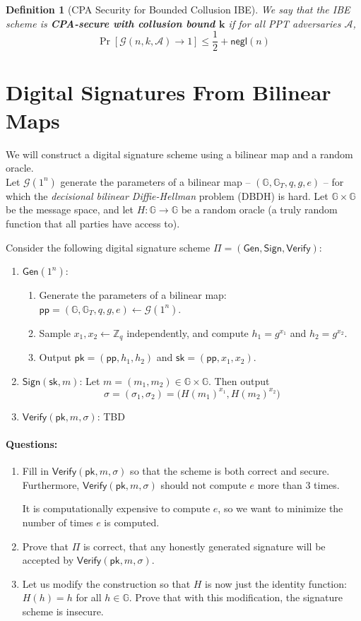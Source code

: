 \documentclass[11pt]{article}
\newtheorem{definition}[theorem]{Definition}
\numberwithin{equation}{section}
\newcommand{\gen}{\mathsf{Gen}}
\newcommand{\sign}{\mathsf{Sign}}
\newcommand{\verify}{\mathsf{Verify}}
\newcommand{\pk}{\mathsf{pk}}
\newcommand{\sk}{\mathsf{sk}}
\newcommand{\params}{\mathsf{pp}}
\newcommand{\A}{\mathcal{A}}
\newcommand{\G}{\mathcal{G}}
\newcommand{\negl}{\mathsf{negl}}
\newcommand{\GG}{\mathbb{G}}
\newcommand{\ZZ}{\mathbb{Z}}
\begin{document}
\begin{definition}[CPA Security for Bounded Collusion IBE]
    We say that the IBE scheme is \textbf{CPA-secure with collusion bound $\mathbf{k}$} if for all PPT adversaries $\A$, 
    \[\Pr[\G(n, k, \A) \to 1] \leq \frac{1}{2} + \negl(n)\]
\end{definition}
\pagebreak


\section{Digital Signatures From Bilinear Maps}
We will construct a digital signature scheme using a bilinear map and a random oracle.\\

Let $\G(1^n)$ generate the parameters of a bilinear map -- $(\GG, \GG_T, q, g, e)$ -- for which the \textit{decisional bilinear Diffie-Hellman} problem (DBDH) is hard.
Let $\GG \times \GG$ be the message space, and let $H: \GG \to \GG$ be a random oracle (a truly random function that all parties have access to).

Consider the following digital signature scheme $\Pi = (\gen, \sign, \verify)$:
\begin{enumerate}
\item $\gen(1^n)$: 
\begin{enumerate}
    \item Generate the parameters of a bilinear map: $\params = (\GG, \GG_T, q, g, e) \leftarrow \G(1^n)$.
    \item Sample $x_1, x_2 \leftarrow \ZZ_q$ independently, and compute $h_1 = g^{x_1}$ and $h_2 = g^{x_2}$.
    \item Output $\pk=(\params, h_1, h_2)$ and $\sk = (\params, x_1, x_2)$.
\end{enumerate}

\item $\sign(\sk, m)$: Let $m = (m_1, m_2) \in \GG \times \GG$. Then output 
\[\sigma = (\sigma_1, \sigma_2) = \big(H(m_1)^{x_1}, H(m_2)^{x_2}\big)\]
\item $\verify(\pk, m, \sigma)$: TBD
\end{enumerate}

\paragraph{Questions:}
\begin{enumerate}
    \item Fill in $\verify(\pk, m, \sigma)$ so that the scheme is both correct and secure. Furthermore, $\verify(\pk, m, \sigma)$ should not compute $e$ more than $3$ times.

    It is computationally expensive to compute $e$, so we want to minimize the number of times $e$ is computed.
    
    \item Prove that $\Pi$ is correct, that any honestly generated signature will be accepted by $\verify(\pk, m, \sigma)$.
    \item Let us modify the construction so that $H$ is now just the identity function: $H(h) = h$ for all $h \in \GG$. Prove that with this modification, the signature scheme is insecure.
\end{enumerate}
\end{document}
